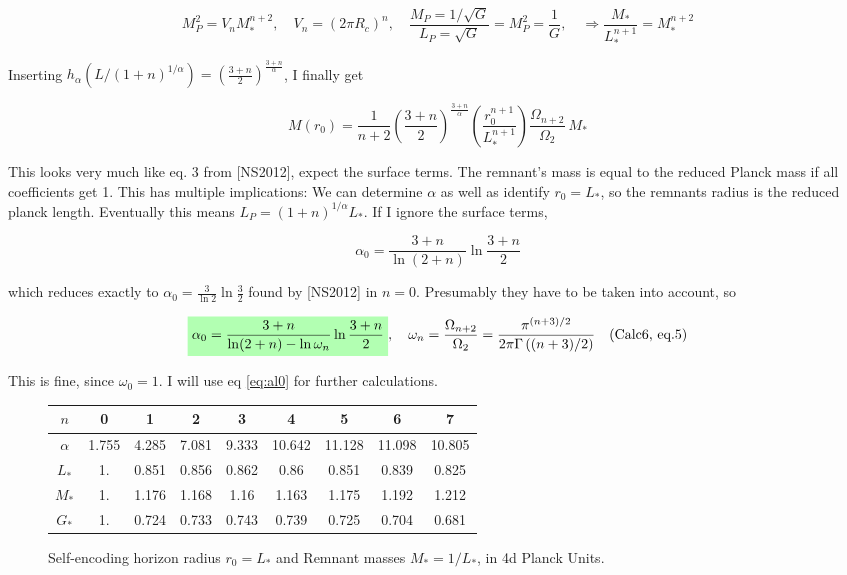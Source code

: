 \documentclass[10pt,a4paper, fleqn]{article}
\newcommand{\highlight}[1]{%
  \colorbox{green!30}{$\displaystyle#1$}}
\begin{document}
\begin{equation}
M_P^2 = V_n M_*^{n+2},\quad V_n = (2\pi R_c)^n, \quad \frac{M_P=1/\sqrt{G}}{L_P=\sqrt{G}} = M_P^2 = \frac{1}{G},\quad \Rightarrow \frac{M_*}{L_*^{n+1}} = M_*^{n+2}
\end{equation}

Inserting $h_\alpha\left(L/(1+n)^{1/\alpha}\right)=\left(\frac{3+n}{2} \right)^{\frac{3+n}{\alpha}}$, I finally get

\begin{equation}
M(r_0) = \frac{1}{n+2} \left( \frac{3+n}{2} \right)^{\frac{3+n}{\alpha}} \left( \frac{r_0^{n+1}}{L_*^{n+1}} \right) \frac{\Omega_{n+2}}{\Omega_2} ~M_* \label{eqn:mr0}
\end{equation}

This looks very much like eq. 3 from [NS2012], expect the surface terms. The remnant's mass is equal to the reduced Planck mass if all coefficients get 1. This has multiple implications: We can determine $\alpha$ as well as identify $r_0 = L_*$, so the remnants radius is the reduced planck length. Eventually this means $L_P = (1+n)^{1/\alpha} L_*$. If I ignore the surface terms,

\begin{equation}
\alpha_0 = \frac{3+n}{\ln(2+n)} \ln \frac{3+n}{2}
\end{equation}

which reduces exactly to $\alpha_0 = \frac{3}{\ln 2} \ln \frac{3}{2}$ found by [NS2012] in $n=0$. Presumably they have to be taken into account, so

\begin{equation}
\highlight{\alpha_0 =  \frac{3+n}{\ln(2+n) - \ln \omega_n} \ln \frac{3+n}{2}}
,\quad \omega_n = \frac{\Omega_{n+2}}{\Omega_2} = \frac{\pi^{(n+3)/2}}{2\pi \Gamma\left( (n+3)/2 \right)}\quad\text{(Calc6, eq.5)} \label{eq:al0}
\end{equation}

This is fine, since $\omega_0=1$. I will use eq \ref{eq:al0} for further calculations.

\newpage
\begin{figure}[h]
\begin{center}
\begin{tabular}{ccccccccc}
\firsthline
 $n$ & 0 & 1 & 2 & 3 & 4 & 5 & 6 & 7 \\
   \hline
 $\alpha$  & 1.755 & 4.285 & 7.081 & 9.333 &
   10.642 & 11.128 & 11.098 & 10.805 \\
 $L_*$ & 1. & 0.851 & 0.856 & 0.862 & 0.86 &
   0.851 & 0.839 & 0.825 \\
 $M_*$ & 1. & 1.176 & 1.168 & 1.16 & 1.163 &
   1.175 & 1.192 & 1.212 \\
 $G_*$ & 1. & 0.724 & 0.733 & 0.743 & 0.739 &
   0.725 & 0.704 & 0.681 \\
   \hline
\end{tabular}
\end{center}
\caption{Self-encoding horizon radius $r_0=L_*$ and Remnant masses $M_* = 1/L_*$, in 4d Planck Units.}\label{table:L}
\end{figure}
\end{document}
